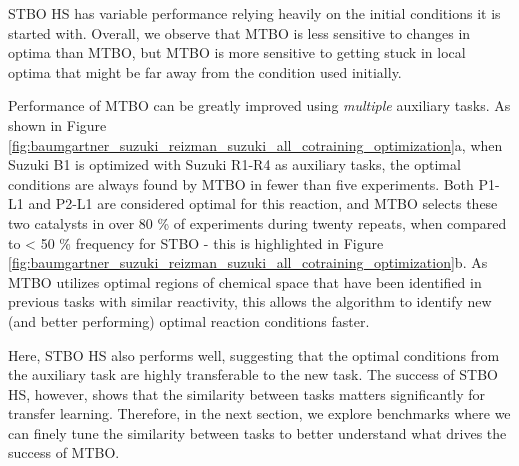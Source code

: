 STBO HS has variable performance relying heavily on the initial conditions it is started with. Overall, we observe that MTBO is less sensitive to changes in optima than MTBO, but MTBO is more sensitive to getting stuck in local optima that might be far away from the condition used initially. 

Performance of MTBO can be greatly improved using \textit{multiple} auxiliary tasks. As shown in Figure \ref{fig:baumgartner_suzuki_reizman_suzuki_all_cotraining_optimization}a, when Suzuki B1 is optimized with Suzuki R1-R4 as auxiliary tasks, the optimal conditions are always found by MTBO in fewer than five experiments. Both P1-L1 and P2-L1 are considered optimal for this reaction, and MTBO selects these two catalysts in over 80 \% of experiments during twenty repeats, when compared to \textless{} 50 \% frequency for STBO - this is highlighted in Figure \ref{fig:baumgartner_suzuki_reizman_suzuki_all_cotraining_optimization}b. As MTBO utilizes optimal regions of chemical space that have been identified in previous tasks with similar reactivity, this allows the algorithm to identify new (and better performing) optimal reaction conditions faster.


Here, STBO HS also performs well, suggesting that the optimal conditions from the auxiliary task are highly transferable to the new task. The success of STBO HS, however, shows that the similarity between tasks matters significantly for transfer learning. Therefore, in the next section, we explore benchmarks where we can finely tune the similarity between tasks to better understand what drives the success of MTBO.

